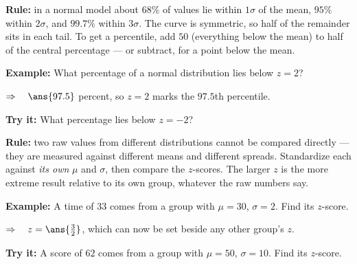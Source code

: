 \documentclass[12pt]{article}
\begin{document}

\begin{formulabox}
\textbf{Rule:} in a normal model about $68\%$ of values lie within $1\sigma$ of the mean,
$95\%$ within $2\sigma$, and $99.7\%$ within $3\sigma$. The curve is symmetric, so half of the
remainder sits in each tail. To get a percentile, add $50$ (everything below the mean) to half
of the central percentage --- or subtract, for a point below the mean.
\end{formulabox}

\begin{examplebox}
\textbf{Example:} \quad What percentage of a normal distribution lies below $z = 2$?

$\Rightarrow\quad \ans{97.5}$ percent, so $z = 2$ marks the $97.5$th percentile.
\end{examplebox}

\begin{tryitbox}
\textbf{Try it:} \quad What percentage lies below $z = -2$?\\[2pt]
\end{tryitbox}


\begin{formulabox}
\textbf{Rule:} two raw values from different distributions cannot be compared directly ---
they are measured against different means and different spreads. Standardize each against
\emph{its own} $\mu$ and $\sigma$, then compare the $z$-scores. The larger $z$ is the more
extreme result relative to its own group, whatever the raw numbers say.
\end{formulabox}

\begin{examplebox}
\textbf{Example:} \quad A time of $33$ comes from a group with $\mu = 30$, $\sigma = 2$. Find its $z$-score.

$\Rightarrow\quad z = \ans{\tfrac{3}{2}}$, which can now be set beside any other group's $z$.
\end{examplebox}

\begin{tryitbox}
\textbf{Try it:} \quad A score of $62$ comes from a group with $\mu = 50$, $\sigma = 10$. Find its $z$-score.\\[2pt]
\end{tryitbox}
\end{document}
